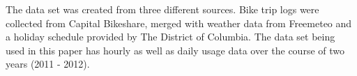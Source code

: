 \documentclass[12pt]{article}
\begin{document}
The data set was created from three different sources. Bike trip logs were
collected from Capital Bikeshare, merged with weather data from Freemeteo and a
holiday schedule provided by The District of Columbia. The data set being used
in this paper has hourly as well as daily usage data over the course of two
years (2011 - 2012).




\end{document}
